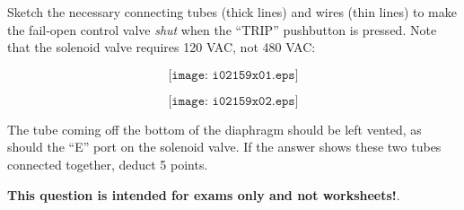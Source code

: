 

Sketch the necessary connecting tubes (thick lines) and wires (thin lines) to make the fail-open control valve {\it shut} when the ``TRIP'' pushbutton is pressed.  Note that the solenoid valve requires 120 VAC, not 480 VAC:

$$\texttt{[image: i02159x01.eps]}$$







$$\texttt{[image: i02159x02.eps]}$$

The tube coming off the bottom of the diaphragm should be left vented, as should the ``E'' port on the solenoid valve.  If the answer shows these two tubes connected together, deduct 5 points.







{\bf This question is intended for exams only and not worksheets!}.



